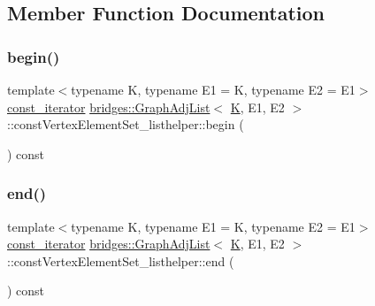 \subsection{Member Function Documentation}
\mbox{\label{classbridges_1_1_graph_adj_list_1_1const_vertex_element_set__listhelper_a006c4ee341ba478ea8f22c485a2c099d}} 
\subsubsection{\texorpdfstring{begin()}{begin()}}
{\footnotesize\ttfamily template$<$typename K, typename E1 = K, typename E2 = E1$>$ \\
\mbox{\hyperlink{classbridges_1_1_graph_adj_list_1_1const_vertex_element_set__listhelper_1_1const__iterator}{const\+\_\+iterator}} \mbox{\hyperlink{classbridges_1_1_graph_adj_list}{bridges\+::\+Graph\+Adj\+List}}$<$ \mbox{\hyperlink{namespacebridges_acfb0a4f7877d8f63de3e6862004c50edaa5f3c6a11b03839d46af9fb43c97c188}{K}}, E1, E2 $>$\+::const\+Vertex\+Element\+Set\+\_\+listhelper\+::begin (\begin{DoxyParamCaption}{ }\end{DoxyParamCaption}) const\hspace{0.3cm}{\ttfamily [inline]}}

\mbox{\label{classbridges_1_1_graph_adj_list_1_1const_vertex_element_set__listhelper_a899b6c2765f09fd4e238cfaf869de667}} 
\subsubsection{\texorpdfstring{end()}{end()}}
{\footnotesize\ttfamily template$<$typename K, typename E1 = K, typename E2 = E1$>$ \\
\mbox{\hyperlink{classbridges_1_1_graph_adj_list_1_1const_vertex_element_set__listhelper_1_1const__iterator}{const\+\_\+iterator}} \mbox{\hyperlink{classbridges_1_1_graph_adj_list}{bridges\+::\+Graph\+Adj\+List}}$<$ \mbox{\hyperlink{namespacebridges_acfb0a4f7877d8f63de3e6862004c50edaa5f3c6a11b03839d46af9fb43c97c188}{K}}, E1, E2 $>$\+::const\+Vertex\+Element\+Set\+\_\+listhelper\+::end (\begin{DoxyParamCaption}{ }\end{DoxyParamCaption}) const\hspace{0.3cm}{\ttfamily [inline]}}



